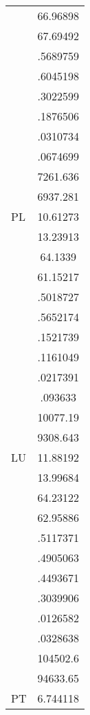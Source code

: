 {\begin{tabular}{l*{1}{c}}
                    &    66.96898\\
                    &    67.69492\\
                    &    .5689759\\
                    &    .6045198\\
                    &    .3022599\\
                    &    .1876506\\
                    &    .0310734\\
                    &    .0674699\\
                    &    7261.636\\
                    &    6937.281\\
PL                  &    10.61273\\
                    &    13.23913\\
                    &     64.1339\\
                    &    61.15217\\
                    &    .5018727\\
                    &    .5652174\\
                    &    .1521739\\
                    &    .1161049\\
                    &    .0217391\\
                    &     .093633\\
                    &    10077.19\\
                    &    9308.643\\
LU                  &    11.88192\\
                    &    13.99684\\
                    &    64.23122\\
                    &    62.95886\\
                    &    .5117371\\
                    &    .4905063\\
                    &    .4493671\\
                    &    .3039906\\
                    &    .0126582\\
                    &    .0328638\\
                    &    104502.6\\
                    &    94633.65\\
PT                  &    6.744118\\

\end{tabular}}
